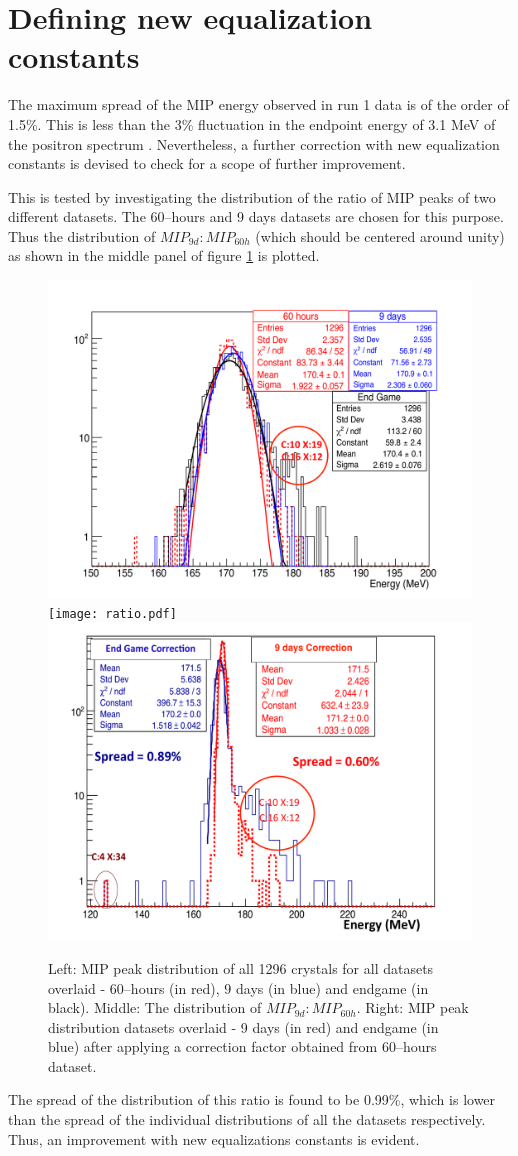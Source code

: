 \documentclass[article,accept,moreauthors,pdftex,10pt,a4paper]{../MDPI_template/Definitions/mdpi}
\begin{document}
  

\section{Defining new equalization constants}
\noindent The maximum spread of the MIP energy observed in run 1 data is of the order of 1.5\%. This 
is less than the 3\% fluctuation in the endpoint energy of 3.1 MeV of the positron spectrum \cite{c2}. 
Nevertheless, a further correction with new equalization constants is devised 
to check for a scope of further improvement. 
 
 
This is tested by investigating  the distribution of the ratio of MIP peaks of two different datasets. The 60--hours 
and 9 days datasets are chosen for this purpose. Thus the distribution of $MIP_{9d}:MIP_{60h}$ (which 
should be centered around unity) as shown in the middle panel of figure \ref{fig8} is plotted. 
\begin{figure}[H]
\centering
\includegraphics[width=5.3 cm]{comp_all_1.pdf}
\texttt{[image: ratio.pdf]}
\includegraphics[width=5.1 cm]{comp_corr.pdf}
\caption{\label{fig8}Left: MIP peak distribution of all 1296 crystals for all datasets overlaid - 60--hours (in red), 
9 days (in blue) and endgame (in black). Middle: The distribution of $MIP_{9d}:MIP_{60h}$. Right: MIP peak distribution 
datasets overlaid - 9 days (in red) and endgame (in blue) after applying a correction factor obtained from 60--hours dataset.}
\end{figure} 
The spread of the distribution of this ratio is found to be 0.99\%, which is 
lower than the spread of the individual distributions of all the datasets respectively. 
Thus, an improvement with new equalizations constants is evident. %
\end{document}
